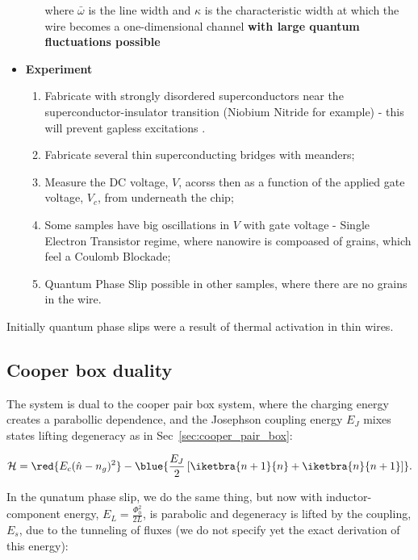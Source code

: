\begin{framed}
\begin{itemize}
\begin{enumerate}
      \noindent where $\bar{\omega}$ is the line  width and $\kappa$ is the characteristic
      width at  which the  wire becomes  a one-dimensional  channel \textbf{with
        large quantum fluctuations possible}
    \end{enumerate}
  \item \textbf{Experiment}
    \begin{enumerate}
    \item   Fabricate  with   strongly  disordered   superconductors  near   the
      superconductor-insulator transition  (Niobium Nitride for example)  - this
      will prevent gapless excitations \cite{Astafiev_2012}.
    \item Fabricate several thin superconducting bridges with meanders;
    \item  Measure the  DC voltage,  $ V  $, acorss  then as  a function  of the
      applied gate voltage, $ V_c $, from underneath the chip;
    \item Some samples have big oscillations in $ V $ with gate voltage - Single
      Electron Transistor regime,  where nanowire is compoased  of grains, which
      feel a Coulomb Blockade;
    \item  Quantum Phase  Slip possible  in other  samples, where  there are  no
      grains in the wire.
    \end{enumerate}
  \end{itemize}
\end{framed}

Initially quantum phase slips were a result of thermal activation in thin wires.

\subsection{Cooper box duality}
The system  is dual  to the cooper  pair box system,  where the  charging energy
creates a parabollic dependence, and the Josephson coupling energy $ E_J $ mixes
states lifting degeneracy as in Sec~\ref{sec:cooper_pair_box}:

 \begin{equation}\label{key}
   \mathcal{H} = \red{E_c(\hat{n} - n_g)^2} - \blue{\frac{E_J}{2}\left[\iketbra{n+1}{n} + \iketbra{n}{n+1}\right]}.
 \end{equation}

 \noindent  In the  qunatum phase  slip,  we do  the  same thing,  but now  with
 inductor-component  energy,  $  E_L  = \frac{\Phi_0^2}{2L}  $,  is  parabolic  and
 degeneracy is lifted by  the coupling, $ E_s $, due to  the tunneling of fluxes
 (we do not specify yet the exact derivation of this energy):

